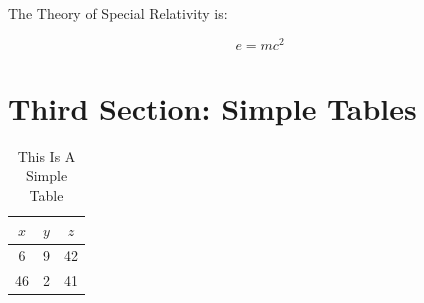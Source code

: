 \documentclass[12pt,letterpaper]{article}
\begin{document}
The Theory of Special Relativity is:

\begin{equation}
    e = mc^2
\end{equation}

\section{Third Section: Simple Tables}

\begin{table}[h!]
    \caption{This Is A Simple Table}
    \begin{center}
        \begin{tabular}{c c c} %
            $x$ & $y$ &  $z$\\
            \hline
            6 & 9 & 42\\
            \hline
            46 & 2 & 41\\
        \end{tabular}
    \end{center}
\end{table}
\end{document}
